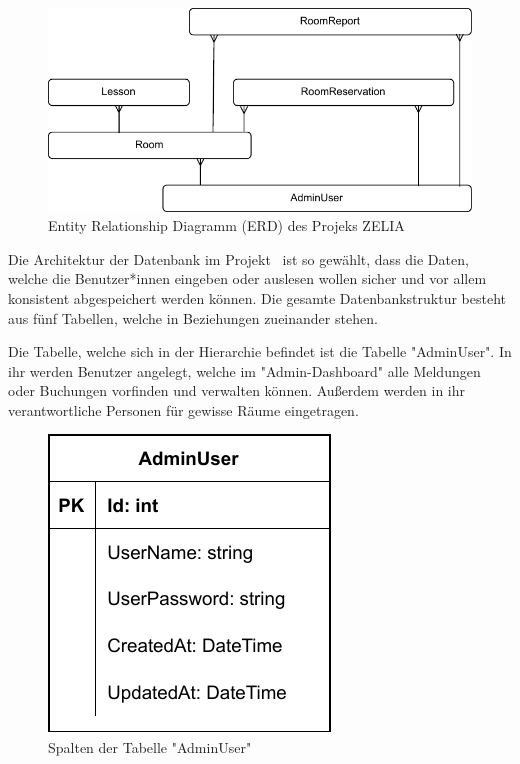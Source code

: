 
\begin{figure}[H]
    \centering
    \includegraphics{media/MariaDB/ERD.svg.pdf}
    \caption{Entity Relationship Diagramm (ERD) des Projeks ZELIA}
\end{figure}

Die Architektur der Datenbank im Projekt \ZELIA\ ist so gewählt, dass die Daten, welche die Benutzer*innen eingeben oder auslesen wollen sicher und vor allem konsistent abgespeichert werden können. Die gesamte Datenbankstruktur besteht aus fünf Tabellen, welche in Beziehungen zueinander stehen.


Die Tabelle, welche sich in der Hierarchie befindet ist die Tabelle "AdminUser". In ihr werden Benutzer angelegt, welche im "Admin-Dashboard" alle Meldungen oder Buchungen vorfinden und verwalten können. Außerdem werden in ihr verantwortliche Personen für gewisse Räume eingetragen.

\begin{figure}[H]
    \centering
    \includegraphics{media/MariaDB/AdminUser.svg.pdf}
    \caption{Spalten der Tabelle "AdminUser"}
\end{figure}

